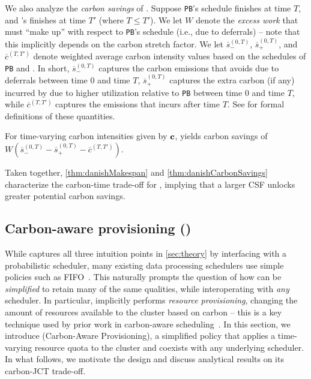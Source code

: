 We also analyze the \textit{carbon savings} of \PCAPS.  
Suppose \texttt{PB}'s schedule finishes at time $T$, and \PCAPS's finishes at time $T'$ (where $T \leq T'$).   We let $W$ denote the \textit{excess work} that \PCAPS must ``make up'' with respect to \texttt{PB}'s schedule (i.e., due to deferrals) -- note that this implicitly depends on the carbon stretch factor.
We let $\overline{s}_{-}^{(0,T)}$, $\overline{s}_{+}^{(0,T)}$, and $\overline{c}^{(T, T')}$ denote weighted average carbon intensity values based on the schedules of \texttt{PB} and \PCAPS.  In short, $\overline{s}_{-}^{(0,T)}$ captures the carbon emissions that \PCAPS avoids due to deferrals between time $0$ and time $T$,  
$\overline{s}_{+}^{(0,T)}$ captures the extra carbon (if any) incurred by \PCAPS due to higher utilization relative to \texttt{PB} between time $0$ and time $T$, %
while $\overline{c}^{(T, T')}$ captures the emissions that \PCAPS incurs after time $T$.  
See  for formal definitions of these quantities.
\begin{thm}\label{thm:danishCarbonSavings}
   For time-varying carbon intensities given by ${\mathbf{c}}$, \PCAPS yields carbon savings of $W ( \overline{s}_{-}^{(0,T)} - \overline{s}_{+}^{(0,T)} - \overline{c}^{(T, T')} )$.
\end{thm}
\noindent Taken together, \autoref{thm:danishMakespan} and \ref{thm:danishCarbonSavings}  characterize 
the carbon-time trade-off for \PCAPS, implying that a larger CSF unlocks greater potential carbon savings.





\vspace{-0.5em}
\subsection{Carbon-aware provisioning (\CAP)}  \label{sec:cap-design}

While \PCAPS captures all three intuition points in \autoref{sec:theory} by interfacing with a probabilistic scheduler, many existing data processing schedulers use simple policies such as FIFO~\cite{SparkScheduling}.  This naturally prompts the question of how \PCAPS can be \textit{simplified} to retain many of the same qualities, while interoperating with \textit{any} scheduler.
In particular, \PCAPS implicitly performs \textit{resource provisioning}, changing the amount of resources available to the cluster based on carbon -- this is a key technique used by prior work in carbon-aware scheduling~\cite{radovanovic2022carbon, Hanafy:23:CarbonScaler}.  In this section, we introduce \CAP (Carbon-Aware Provisioning), a simplified policy that applies a time-varying resource quota to the cluster and coexists with any underlying scheduler.  In what follows, we motivate the design and discuss analytical results on its carbon-JCT trade-off.



